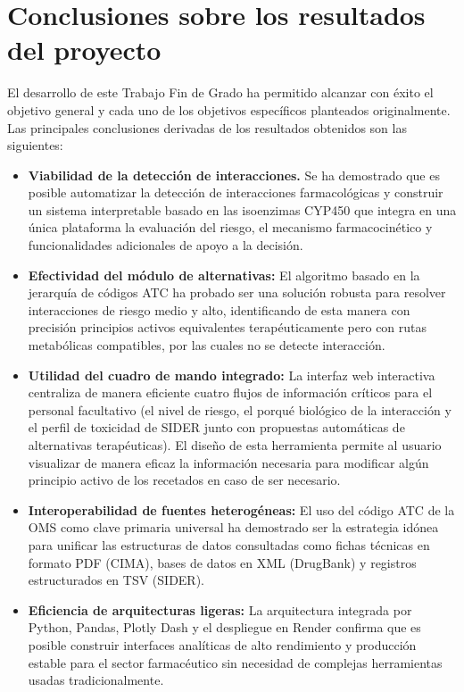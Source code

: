 
\section{Conclusiones sobre los resultados del proyecto}
El desarrollo de este Trabajo Fin de Grado ha permitido alcanzar con éxito el objetivo general y cada uno de los objetivos específicos planteados originalmente. Las principales conclusiones derivadas de los resultados obtenidos son las siguientes:

\begin{itemize}
    \item \textbf{Viabilidad de la detección de interacciones.} Se ha demostrado que es posible automatizar la detección de interacciones farmacológicas y construir un sistema interpretable basado en las isoenzimas CYP450 que integra en una única plataforma la evaluación del riesgo, el mecanismo farmacocinético y funcionalidades adicionales de apoyo a la decisión.
    \item \textbf{Efectividad del módulo de alternativas:} El algoritmo basado en la jerarquía de códigos ATC ha probado ser una solución robusta para resolver interacciones de riesgo medio y alto, identificando de esta manera con precisión principios activos equivalentes terapéuticamente pero con rutas metabólicas compatibles, por las cuales no se detecte interacción.
    \item \textbf{Utilidad del cuadro de mando integrado:} La interfaz web interactiva centraliza de manera eficiente cuatro flujos de información críticos para el personal facultativo (el nivel de riesgo, el porqué biológico de la interacción y el perfil de toxicidad de SIDER junto con propuestas automáticas de alternativas terapéuticas). El diseño de esta herramienta permite al usuario visualizar de manera eficaz la información necesaria para modificar algún principio activo de los recetados en caso de ser necesario.
    \item \textbf{Interoperabilidad de fuentes heterogéneas:} El uso del código ATC de la OMS como clave primaria universal ha demostrado ser la estrategia idónea para unificar las estructuras de datos consultadas como fichas técnicas en formato PDF (CIMA), bases de datos en XML (DrugBank) y registros estructurados en TSV (SIDER).
    \item \textbf{Eficiencia de arquitecturas ligeras:} La arquitectura integrada por Python, Pandas, Plotly Dash y el despliegue en Render confirma que es posible construir interfaces analíticas de alto rendimiento y producción estable para el sector farmacéutico sin necesidad de complejas herramientas usadas tradicionalmente.
\end{itemize}

